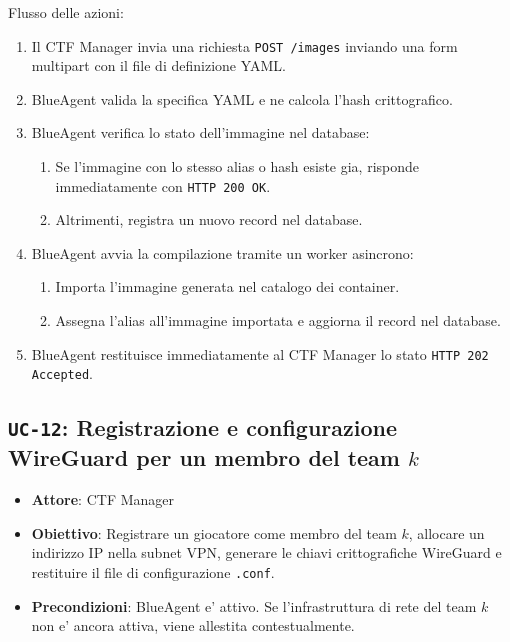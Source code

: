Flusso delle azioni:

\begin{enumerate}
\def\labelenumi{\arabic{enumi}.}
\tightlist
\item
  Il CTF Manager invia una richiesta
  \passthrough{\lstinline!POST /images!} inviando una form multipart con
  il file di definizione YAML.
\item
  BlueAgent valida la specifica YAML e ne calcola l'hash crittografico.
\item
  BlueAgent verifica lo stato dell'immagine nel database:

  \begin{enumerate}
  \def\labelenumii{\arabic{enumii}.}
  \tightlist
  \item
    Se l'immagine con lo stesso alias o hash esiste gia, risponde
    immediatamente con \passthrough{\lstinline!HTTP 200 OK!}.
  \item
    Altrimenti, registra un nuovo record nel database.
  \end{enumerate}
\item
  BlueAgent avvia la compilazione tramite un worker asincrono:

  \begin{enumerate}
  \def\labelenumii{\arabic{enumii}.}
  \tightlist
  \item
    Importa l'immagine generata nel catalogo dei container.
  \item
    Assegna l'alias all'immagine importata e aggiorna il record nel
    database.
  \end{enumerate}
\item
  BlueAgent restituisce immediatamente al CTF Manager lo stato
  \passthrough{\lstinline!HTTP 202 Accepted!}.
\end{enumerate}

\subsection{\texorpdfstring{\texttt{UC-12}: Registrazione e
configurazione WireGuard per un membro del team
\(k\)}{UC-12: Registrazione e configurazione WireGuard per un membro del team k}}\label{uc-12-registrazione-e-configurazione-wireguard-per-un-membro-del-team-k}

\begin{itemize}
\tightlist
\item
  \textbf{Attore}: CTF Manager
\item
  \textbf{Obiettivo}: Registrare un giocatore come membro del team
  \(k\), allocare un indirizzo IP nella subnet VPN, generare le chiavi
  crittografiche WireGuard e restituire il file di configurazione
  \passthrough{\lstinline!.conf!}.
\item
  \textbf{Precondizioni}: BlueAgent e' attivo. Se l'infrastruttura di
  rete del team \(k\) non e' ancora attiva, viene allestita
  contestualmente.
\end{itemize}

